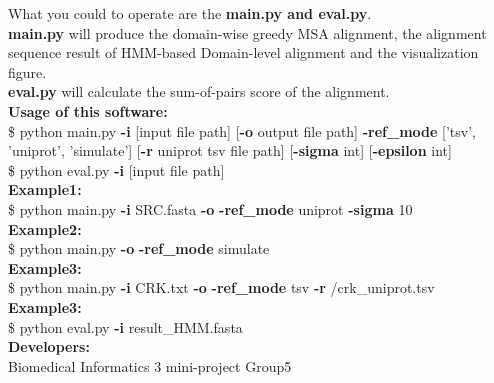 \documentclass{article}
\begin{document}
\noindent What you could to operate are the \textbf{main.py and eval.py}.\\
\noindent \textbf{main.py} will produce the domain-wise greedy MSA alignment, the alignment sequence result of HMM-based Domain-level alignment and the visualization figure.\\
\noindent \textbf{eval.py} will calculate the sum-of-pairs score of the alignment.\\

\noindent \textbf{Usage of this software:}\\
\$ python main.py \textbf{-i} [input file path] [\textbf{-o} output file path] \textbf{-ref\_mode} ['tsv', 'uniprot', 'simulate'] [\textbf{-r} uniprot tsv file path] [\textbf{-sigma} int] [\textbf{-epsilon} int]\\
\$ python eval.py \textbf{-i} [input file path]\\

\noindent \textbf{Example1:}\\
\$ python main.py \textbf{-i} SRC.fasta \textbf{-o} \textbf{-ref\_mode} uniprot \textbf{-sigma} 10\\
\noindent \textbf{Example2:}\\
\$ python main.py  \textbf{-o} \textbf{-ref\_mode} simulate \\
\noindent \textbf{Example3:}\\
\$ python main.py \textbf{-i} CRK.txt \textbf{-o} \textbf{-ref\_mode} tsv \textbf{-r} /crk\_uniprot.tsv\\
\noindent \textbf{Example3:}\\
\$ python eval.py \textbf{-i} result\_HMM.fasta\\

\noindent \textbf{Developers:}\\
Biomedical Informatics 3 mini-project Group5
\end{document}
